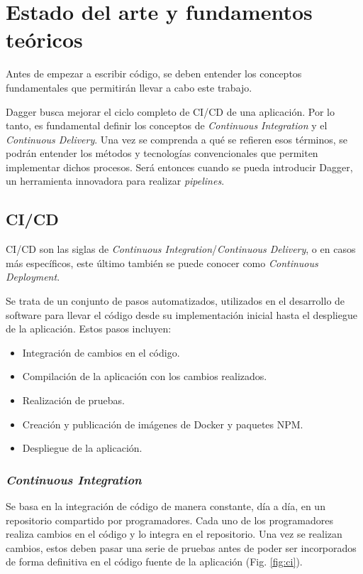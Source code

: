 \chapter{Estado del arte y fundamentos teóricos}

Antes de empezar a escribir código, se deben entender los conceptos fundamentales que permitirán llevar a cabo este trabajo.

Dagger busca mejorar el ciclo completo de CI/CD de una aplicación. Por lo tanto, es fundamental definir los conceptos de \textit{Continuous Integration} y el \textit{Continuous Delivery}. Una vez se comprenda a qué se refieren esos términos, se podrán entender los métodos y tecnologías convencionales que permiten implementar dichos procesos. Será entonces cuando se pueda introducir Dagger, un herramienta innovadora para realizar \textit{pipelines}.

\section{CI/CD}

CI/CD son las siglas de \textit{Continuous Integration}/\textit{Continuous Delivery}, o en casos más específicos, este último también se puede conocer como \textit{Continuous Deployment}.

Se trata de un conjunto de pasos automatizados, utilizados en el desarrollo de software para llevar el código desde su implementación inicial hasta el despliegue de la aplicación. Estos pasos incluyen:

\begin{itemize}
  \item Integración de cambios en el código.
  \item Compilación de la aplicación con los cambios realizados.
  \item Realización de pruebas.
  \item Creación y publicación de imágenes de Docker y paquetes NPM.
  \item Despliegue de la aplicación.
\end{itemize}

\subsection*{\textit{Continuous Integration}}
\label{subsec:CI}

Se basa en la integración de código de manera constante, día a día, en un repositorio compartido por programadores. Cada uno de los programadores realiza cambios en el código y lo integra en el repositorio. Una vez se realizan cambios, estos deben pasar una serie de pruebas antes de poder ser incorporados de forma definitiva en el código fuente de la aplicación (Fig. \ref{fig:ci}).

